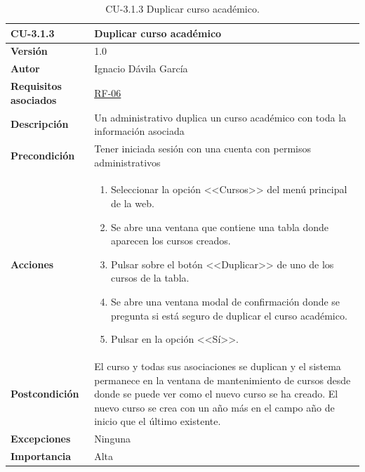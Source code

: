 \begin{table}[p]
\label{table:CU-3.1.3}
	\centering
	\begin{tabularx}{\linewidth}{ p{} p{} }
		\toprule
		\textbf{CU-3.1.3}    & \textbf{Duplicar curso académico}\\
		\toprule
		\textbf{Versión}              & 1.0    \\
		\textbf{Autor}                & Ignacio Dávila García \\
		\textbf{Requisitos asociados} & \hyperref[itm:RF6]{RF-06} \\
		\textbf{Descripción}          & Un administrativo duplica un curso académico con toda la información asociada \\
		\textbf{Precondición}         & Tener iniciada sesión con una cuenta con permisos administrativos \\
		\textbf{Acciones}             &
		\begin{enumerate}
			\def\labelenumi{\arabic{enumi}.}
			\tightlist
			\item Seleccionar la opción <<Cursos>> del menú principal de la web.
			\item Se abre una ventana que contiene una tabla donde aparecen los cursos creados.
			\item Pulsar sobre el botón <<Duplicar>> de uno de los cursos de la tabla.
			\item Se abre una ventana modal de confirmación donde se pregunta si está seguro de duplicar el curso académico.
			\item Pulsar en la opción <<Sí>>.
		\end{enumerate}\\
		\textbf{Postcondición}        & El curso y todas sus asociaciones se duplican y el sistema permanece en la ventana de mantenimiento de cursos desde donde se puede ver como el nuevo curso se ha creado. El nuevo curso se crea con un año más en el campo año de inicio que el último existente. \\
		\textbf{Excepciones}          & Ninguna \\
		\textbf{Importancia}          & Alta \\
		\bottomrule
	\end{tabularx}
	\caption{CU-3.1.3 Duplicar curso académico.}
\end{table}
\FloatBarrier

